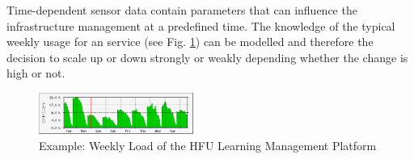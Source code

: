 Time-dependent sensor data contain parameters that can influence the infrastructure management at a predefined time. The knowledge of the typical weekly usage for an service (see Fig. \ref{fig:weakload}) can be modelled and therefore the decision to scale up or down strongly or weakly depending whether the change is high or not.
\begin{figure}[ht]
\includegraphics[width=0.45\textwidth]{fig/olat_week_usage}
\caption{Example: Weekly Load of the HFU Learning Management Platform}
\label{fig:weakload}
\end{figure}

